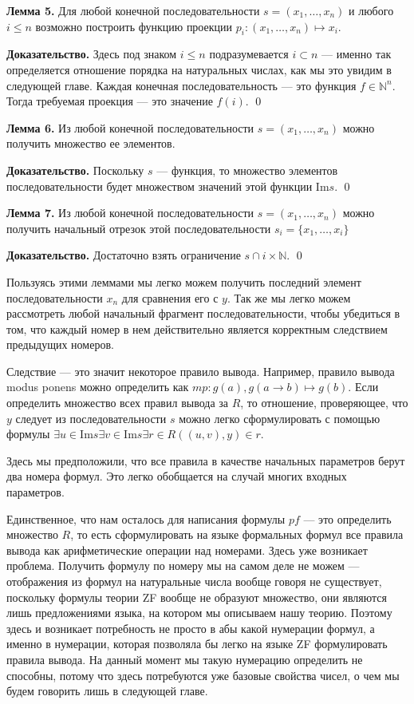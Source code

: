 {\bfseries Лемма 5.} Для любой конечной последовательности $s = (x_1, \ldots, x_n)$ и любого $i\le n$ возможно построить функцию проекции $p_i: (x_1, \dots, x_n)\mapsto x_i$.

{\bfseries Доказательство.} Здесь под знаком $i \le n$ подразумевается $i \subset n$ — именно так определяется отношение порядка на натуральных числах, как мы это увидим в следующей главе. Каждая конечная последовательность — это функция $f\in\mathbb{N}^n$. Тогда требуемая проекция — это значение $f(i)$. \qed

{\bfseries Лемма 6.} Из любой конечной последовательности $s = (x_1, \ldots, x_n)$ можно получить множество ее элементов.

{\bfseries Доказательство.} Поскольку $s$ — функция, то множество элементов последовательности будет множеством значений этой функции $\mathrm{Im} s$. \qed

{\bfseries Лемма 7.} Из любой конечной последовательности $s = (x_1, \ldots, x_n)$ можно получить начальный отрезок этой последовательности $s_i = \{x_1, \ldots, x_i\}$

{\bfseries Доказательство.} Достаточно взять ограничение $s\cap i\times \mathbb{N}$. \qed

Пользуясь этими леммами мы легко можем получить последний элемент последовательности $x_n$ для сравнения его с $y$. Так же мы легко можем рассмотреть любой начальный фрагмент последовательности, чтобы убедиться в том, что каждый номер в нем действительно является корректным следствием предыдущих номеров.

Следствие — это значит некоторое правило вывода. Например, правило вывода modus ponens можно определить как $mp: g(a), g(a\rightarrow b)\mapsto g(b)$. Если определить множество всех правил вывода за $R$, то отношение, проверяющее, что $y$ следует из последовательности $s$ можно легко сформулировать с помощью формулы $\exists u\in \mathrm{Im} s \exists v \in \mathrm{Im} s \exists r\in R ((u, v), y) \in r$.

Здесь мы предположили, что все правила в качестве начальных параметров берут два номера формул. Это легко обобщается на случай многих входных параметров.

Единственное, что нам осталось для написания формулы $pf$ — это определить множество $R$, то есть сформулировать на языке формальных формул все правила вывода как арифметические операции над номерами. Здесь уже возникает проблема. Получить формулу по номеру мы на самом деле не можем — отображения из формул на натуральные числа вообще говоря не существует, поскольку формулы теории ZF вообще не образуют множество, они являются лишь предложениями языка, на котором мы описываем нашу теорию. Поэтому здесь и возникает потребность не просто в абы какой нумерации формул, а именно в нумерации, которая позволяла бы легко на языке ZF формулировать правила вывода. На данный момент мы такую нумерацию определить не способны, потому что здесь потребуются уже базовые свойства чисел, о чем мы будем говорить лишь в следующей главе.

